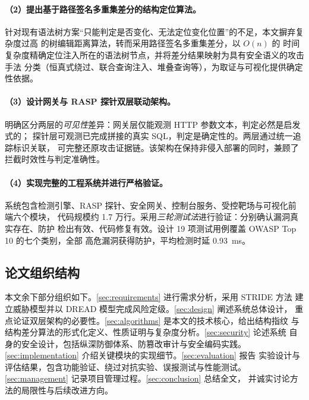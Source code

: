 \paragraph{（2）提出基于路径签名多重集差分的结构定位算法。}
针对现有语法树方案“只能判定是否变化、无法定位变化位置”的不足，本文摒弃复杂度过高
的树编辑距离算法\cite{zhang1989simple}，转而采用路径签名多重集差分，以 $O(n)$ 的
时间复杂度精确定位注入所在的语法树节点，并将差分结果映射为具有安全语义的攻击手法
分类（恒真式绕过、联合查询注入、堆叠查询等），为取证与可视化提供确定性依据。

\paragraph{（3）设计网关与 RASP 探针双层联动架构。}
明确区分两层的\emph{可见性}差异：网关层仅能观测 HTTP 参数文本，判定必然是启发式的；
探针层可观测已完成拼接的真实 SQL，判定是确定性的。两层通过统一追踪标识关联，
可完整还原攻击证据链。该架构在保持非侵入部署的同时，兼顾了拦截时效性与判定准确性。

\paragraph{（4）实现完整的工程系统并进行严格验证。}
系统包含检测引擎、RASP 探针、安全网关、控制台服务、受控靶场与可视化前端六个模块，
代码规模约 1.7 万行。采用\emph{三轮测试法}进行验证：分别确认漏洞真实存在、防护
检出有效、代码修复有效。设计 19 项测试用例覆盖 OWASP Top 10 的七个类别，全部
高危漏洞获得防护，平均检测时延 0.93~ms。

\subsection{论文组织结构}

本文余下部分组织如下。\cref{sec:requirements} 进行需求分析，采用 STRIDE 方法
建立威胁模型并以 DREAD 模型完成风险定级。\cref{sec:design} 阐述系统总体设计，
重点论证双层架构的必要性。\cref{sec:algorithms} 是本文的技术核心，给出结构指纹
与结构差分算法的形式化定义、性质证明与复杂度分析。\cref{sec:security} 论述系统
自身的安全设计，包括纵深防御体系、防篡改审计与安全编码实践。
\cref{sec:implementation} 介绍关键模块的实现细节。\cref{sec:evaluation} 报告
实验设计与评估结果，包含功能验证、绕过对抗实验、误报测试与性能测试。
\cref{sec:management} 记录项目管理过程。\cref{sec:conclusion} 总结全文，
并诚实讨论方法的局限性与后续改进方向。

